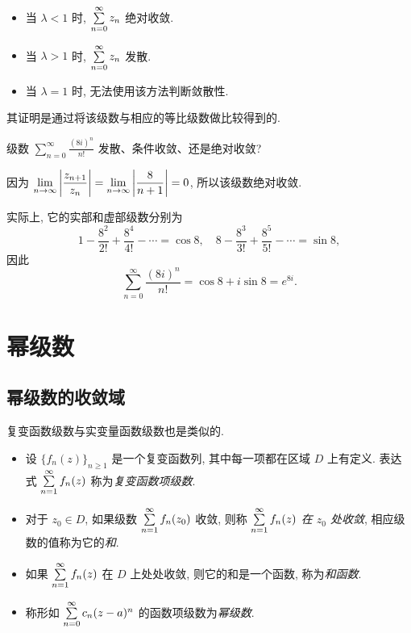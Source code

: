 \begin{itemize}
	\item 当 $\lambda<1$ 时, $\sum\limits_{n=0}^\infty z_n$ 绝对收敛.
	\item 当 $\lambda>1$ 时, $\sum\limits_{n=0}^\infty z_n$ 发散.
	\item 当 $\lambda=1$ 时, 无法使用该方法判断敛散性.
\end{itemize}
其证明是通过将该级数与相应的等比级数做比较得到的.

\begin{example}
	级数 $\displaystyle\sum_{n=0}^\infty\frac{(8i)^n}{n!}$ 发散、条件收敛、还是绝对收敛?
\end{example}

\begin{solution}
	因为 $\displaystyle\lim_{n\to\infty}\left|\frac{z_{n+1}}{z_n}\right|=\lim_{n\to\infty}\left|\dfrac{8}{n+1}\right|=0$, 所以该级数绝对收敛.
\end{solution}

实际上, 它的实部和虚部级数分别为
\[1-\frac{8^2}{2!}+\frac{8^4}{4!}-\cdots=\cos 8,\quad
8-\frac{8^3}{3!}+\frac{8^5}{5!}-\cdots=\sin 8,\]
因此
\[\sum_{n=0}^\infty\frac{(8i)^n}{n!}=\cos 8+i\sin 8=e^{8i}.\]

\section{幂级数}

\subsection{幂级数的收敛域}

复变函数级数与实变量函数级数也是类似的.

\begin{definition}
	\begin{itemize}
		\item 设 $\{f_n(z)\}_{n\ge 1}$ 是一个复变函数列, 其中每一项都在区域 $D$ 上有定义.
		表达式 $\sum\limits_{n=1}^\infty f_n(z)$ 称为\emph{复变函数项级数}.
		\item 对于 $z_0\in D$, 如果级数 $\sum\limits_{n=1}^\infty f_n(z_0)$ 收敛, 则称 \emph{$\sum\limits_{n=1}^\infty f_n(z)$ 在 $z_0$ 处收敛}, 相应级数的值称为它的\emph{和}.
		\item 如果 $\sum\limits_{n=1}^\infty f_n(z)$ 在 $D$ 上处处收敛, 则它的和是一个函数, 称为\emph{和函数}.
		\item 称形如 $\sum\limits_{n=0}^\infty c_n(z-a)^n$ 的函数项级数为\emph{幂级数}.
	\end{itemize}
\end{definition}

